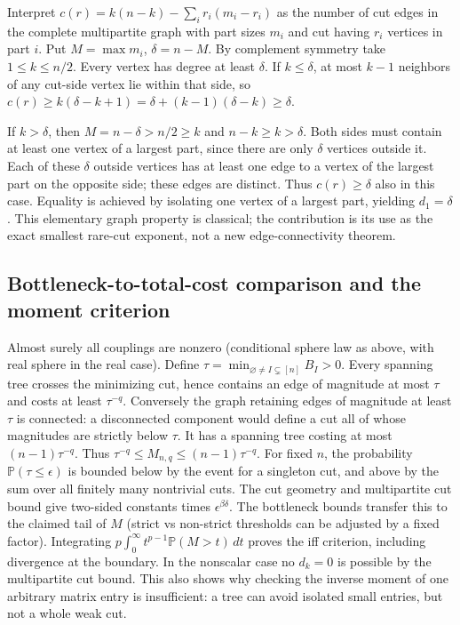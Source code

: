 \documentclass[11pt]{article}
\begin{document}
Interpret \(c(r)=k(n-k)-\sum_i r_i(m_i-r_i)\) as the number of cut edges in the complete multipartite graph with part sizes \(m_i\) and cut having \(r_i\) vertices in part \(i\). Put \(M=\max m_i\), \(\delta=n-M\). By complement symmetry take \(1\le k\le n/2\). Every vertex has degree at least \(\delta\). If \(k\le\delta\), at most \(k-1\) neighbors of any cut-side vertex lie within that side, so \(c(r)\ge k(\delta-k+1)=\delta+(k-1)(\delta-k)\ge\delta\).

If \(k>\delta\), then \(M=n-\delta>n/2\ge k\) and \(n-k\ge k>\delta\). Both sides must contain at least one vertex of a largest part, since there are only \(\delta\) vertices outside it. Each of these \(\delta\) outside vertices has at least one edge to a vertex of the largest part on the opposite side; these edges are distinct. Thus \(c(r)\ge\delta\) also in this case. Equality is achieved by isolating one vertex of a largest part, yielding \(d_1=\delta\). This elementary graph property is classical; the contribution is its use as the exact smallest rare-cut exponent, not a new edge-connectivity theorem.

\subsection{Bottleneck-to-total-cost comparison and the moment criterion}\label{bottleneck-to-total-cost-comparison-and-the-moment-criterion}

Almost surely all couplings are nonzero (conditional sphere law as above, with real sphere in the real case). Define \(\tau=\min_{\varnothing\ne I\subsetneq[n]} B_I>0\). Every spanning tree crosses the minimizing cut, hence contains an edge of magnitude at most \(\tau\) and costs at least \(\tau^{-q}\). Conversely the graph retaining edges of magnitude at least \(\tau\) is connected: a disconnected component would define a cut all of whose magnitudes are strictly below \(\tau\). It has a spanning tree costing at most \((n-1)\tau^{-q}\). Thus \(\tau^{-q}\le M_{n,q}\le(n-1)\tau^{-q}\). For fixed \(n\), the probability \(\mathbb P(\tau\le\epsilon)\) is bounded below by the event for a singleton cut, and above by the sum over all finitely many nontrivial cuts. The cut geometry and multipartite cut bound give two-sided constants times \(\epsilon^{\beta\delta}\). The bottleneck bounds transfer this to the claimed tail of \(M\) (strict vs non-strict thresholds can be adjusted by a fixed factor). Integrating \(p\int_0^\infty t^{p-1}\mathbb P(M>t)\,dt\) proves the iff criterion, including divergence at the boundary. In the nonscalar case no \(d_k=0\) is possible by the multipartite cut bound. This also shows why checking the inverse moment of one arbitrary matrix entry is insufficient: a tree can avoid isolated small entries, but not a whole weak cut.
\end{document}
